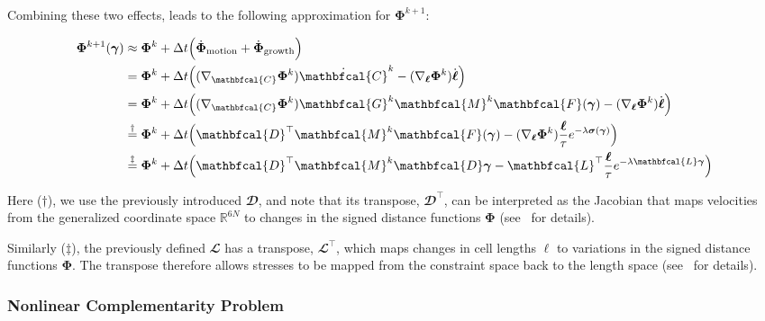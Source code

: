 \documentclass[conference]{IEEEtran}
\begin{document}
Combining these two effects, leads to the following approximation for $\mathbf{\Phi}^{k+1}$:

\begin{equation}\label{eq:phi_expanded}
    \small
    \begin{split}
        \mathbf{\Phi}^{k+1}(\boldsymbol{\gamma}) & \approx \mathbf{\Phi}^k + \Delta t \Bigl( \dot{\mathbf{\Phi}}_{\text{motion}} + \dot{\mathbf{\Phi}}_{\text{growth}} \Bigr)\\
        & = \mathbf{\Phi}^k + \Delta t \Bigl( (\nabla_{\mathbfcal{C}} \mathbf{\Phi}^k) \dot{\mathbfcal{C}}^k - (\nabla_{\boldsymbol{\ell}} \mathbf{\Phi}^k) \dot{\boldsymbol{\ell}} \Bigr)\\
        & = \mathbf{\Phi}^k + \Delta t \Bigl( (\nabla_{\mathbfcal{C}} \mathbf{\Phi}^k) \mathbfcal{G}^k \mathbfcal{M}^k  \mathbfcal{F}(\boldsymbol{\gamma}) - (\nabla_{\boldsymbol{\ell}} \mathbf{\Phi}^k) \dot{\boldsymbol{\ell}} \Bigr)\\
        & \overset{\dagger}{=}
        \mathbf{\Phi}^k + \Delta t \Bigl( \mathbfcal{D}^\top \mathbfcal{M}^k  \mathbfcal{F}(\boldsymbol{\gamma})
        - (\nabla_{\boldsymbol{\ell}} \mathbf{\Phi}^k) \frac{\boldsymbol{\ell}}{\tau}
        e^{-\lambda \boldsymbol{\sigma}(\boldsymbol{\gamma})} \Bigr)\\
        & \overset{\ddagger}{=} \mathbf{\Phi}^k + \Delta t \Bigl( \mathbfcal{D}^\top \mathbfcal{M}^k \mathbfcal{D} \boldsymbol{\gamma} - \mathbfcal{L}^\top \frac{\boldsymbol{\ell}}{\tau} e^{-\lambda \mathbfcal{L} \boldsymbol{\gamma}} \Bigr)
    \end{split}
\end{equation}

Here ($\dagger$), we use the previously introduced $\mathbfcal{D}$, and note that its transpose, $\mathbfcal{D}^\top$, can be interpreted as the Jacobian that maps velocities from the generalized coordinate space $\mathbb{R}^{6N}$ to changes in the signed distance functions $\mathbf{\Phi}$ (see~\cite{Weady2024SM, Tasora2008} for details).

Similarly ($\ddagger$), the previously defined $\mathbfcal{L}$ has a transpose, $\mathbfcal{L}^\top$, which maps changes in cell lengths $\boldsymbol{\ell}$ to variations in the signed distance functions $\mathbf{\Phi}$. The transpose therefore allows stresses to be mapped from the constraint space back to the length space (see~\cite{Weady2024SM} for details).

\subsubsection{Nonlinear Complementarity Problem}
\end{document}
